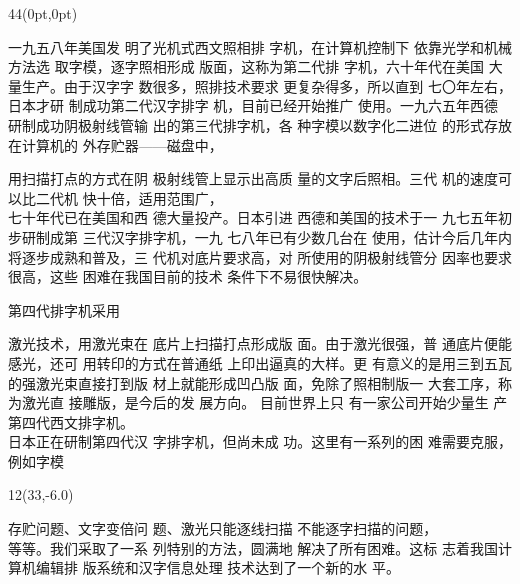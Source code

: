 \documentclass[linespread=1]{ctexart}
\begin{document}
\begin{textblock*}{44\ccwd}(0pt,0pt)
\begin{minipage}[t]{10\ccwd}
\setlength{\parindent}{2\ccwd}
一九五八年美国发
明了光机式西文照相排
字机，在计算机控制下
依靠光学和机械方法选
取字模，逐字照相形成
版面，这称为第二代排
字机，六十年代在美国
大量生产。由于汉字字
数很多，照排技术要求
更复杂得多，所以直到
七〇年左右，日本才研
制成功第二代汉字排字
机，目前已经开始推广
使用。一九六五年西德
研制成功阴极射线管输
出的第三代排字机，各
种字模以数字化二进位
的形式存放在计算机的
外存贮器——磁盘中，
\end{minipage}%
\hspace{\ccwd}%
\begin{minipage}[t]{10\ccwd}
用扫描打点的方式在阴
极射线管上显示出高质
量的文字后照相。三代
机的速度可以比二代机
快十倍，适用范围广，\\
七十年代已在美国和西
德大量投产。日本引进
西德和美国的技术于一
九七五年初步研制成第
三代汉字排字机，一九
七八年已有少数几台在
使用，估计今后几年内
将逐步成熟和普及，三
代机对底片要求高，对
所使用的阴极射线管分
因率也要求很高，这些
困难在我国目前的技术
条件下不易很快解决。

\setlength{\parindent}{2\ccwd}
第四代排字机采用
\end{minipage}%
\hspace{\ccwd}%
\begin{minipage}[t]{10\ccwd}
激光技术，用激光束在
底片上扫描打点形成版
面。由于激光很强，普
通底片便能感光，还可
用转印的方式在普通纸
上印出逼真的大样。更
有意义的是用三到五瓦
的强激光束直接打到版
材上就能形成凹凸版
面，免除了照相制版一
大套工序，称为激光直
接雕版，是今后的发\linebreak
展方向。 目前世界上只
有一家公司开始少量生
产第四代西文排字机。\\
日本正在研制第四代汉
字排字机，但尚未成
功。这里有一系列的困
难需要克服，例如字模
\end{minipage}%
\end{textblock*}

\begin{textblock*}{12\ccwd}(33\ccwd,-6.0\ccwd)
\begin{minipage}[t]{10\ccwd}
存贮问题、文字变倍问
题、激光只能逐线扫描
不能逐字扫描的问题，\\
等等。我们采取了一系
列特别的方法，圆满地
解决了所有困难。这标
志着我国计算机编辑排
版系统和汉字信息处理
技术达到了一个新的水
平。
\end{minipage}%
\end{textblock*}
\end{document}
